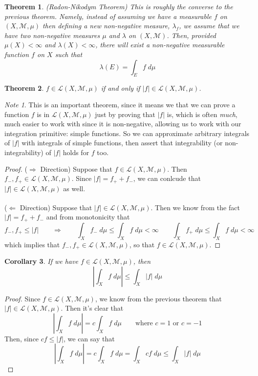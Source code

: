 \documentclass[12pt]{article}
\theoremstyle{plain}
\newtheorem{thm}{Theorem}[subsection]
\newtheorem{cor}[thm]{Corollary}
\theoremstyle{definition}
\theoremstyle{remark}
\newtheorem*{note}{Note}
\begin{document}
\begin{thm}
\emph{(Radon-Nikodym Theorem)} This is roughly the converse to the previous theorem. Namely, instead of assuming we have a measurable $f$ on $(X,\mathscr{M},\mu)$ then defining a new non-negative measure, $\lambda_f$, we assume that we have two non-negative measures $\mu$ and $\lambda$ on $(X,\mathscr{M})$. Then, provided $\mu(X)<\infty$ and $\lambda(X)<\infty$, there will exist a non-negative measurable function $f$ on $X$ such that
\[
    \lambda(E) = \int_E f \; d\mu
\]
\end{thm}

\begin{thm}
$f\in\mathscr{L}(X,\mathscr{M},\mu)$ if and only if $|f|\in\mathscr{L}(X,\mathscr{M},\mu)$.
\end{thm}
\begin{note}
This is an important theorem, since it means we that we can prove a function $f$ is in $\mathscr{L}(X,\mathscr{M},\mu)$ just by proving that $|f|$ is, which is often \emph{much}, much easier to work with since it is non-negative, allowing us to work with our integration primitive: simple functions. So we can approximate arbitrary integrals of $|f|$ with integrals of simple functions, then assert that integrability (or non-integrability) of $|f|$ holds for $f$ too.
\end{note}
\begin{proof}
($\Rightarrow$ Direction) Suppose that $f\in\mathscr{L}(X,\mathscr{M},\mu)$. Then $f_-, f_+\in\mathscr{L}(X,\mathscr{M},\mu)$. Since $|f|=f_+ + f_-$, we can conlcude that $|f|\in\mathscr{L}(X,\mathscr{M},\mu)$ as well.
\\
\\
($\Leftarrow$ Direction) Suppose that $|f|\in\mathscr{L}(X,\mathscr{M},\mu)$. Then we know from the fact $|f|=f_+ + f_-$ and from monotonicity that
\[
    f_-, f_+ \leq |f| \qquad \Rightarrow
    \qquad 
    \int_X f_- \; d\mu \leq \int_X f \; d\mu <\infty\qquad
    \int_X f_+ \; d\mu \leq \int_X f \; d\mu <\infty
\]
which implies that $f_-, f_+\in\mathscr{L}(X,\mathscr{M},\mu)$, so that $f\in\mathscr{L}(X,\mathscr{M},\mu)$.
\end{proof}

\begin{cor} If we have $f\in\mathscr{L}(X,\mathscr{M},\mu)$, then 
\[ 
    \left\lvert \int_X f \; d\mu\right\rvert \leq
    \int_X \left\lvert f \right\rvert \; d\mu
\]
\end{cor}
\begin{proof}
Since $f\in\mathscr{L}(X,\mathscr{M},\mu)$, we know from the previous theorem that $|f|\in\mathscr{L}(X,\mathscr{M},\mu)$. Then it's clear that 
\[ 
    \left\lvert \int_X f \; d\mu\right\rvert 
    = c \int_X f \; d\mu\qquad\text{where $c=1$ or $c=-1$}
\]
Then, since $cf\leq |f|$, we can say that 
\[ 
    \left\lvert \int_X f \; d\mu\right\rvert 
    = c \int_X f \; d\mu 
    = \int_X c f \; d\mu \leq 
     \int_X |f| \; d\mu 
\]
\end{proof}
\end{document}
